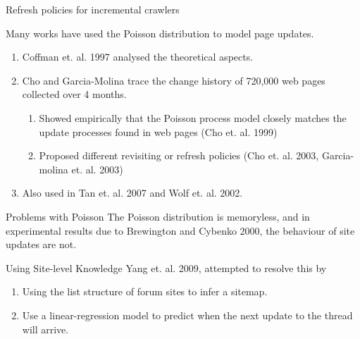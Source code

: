 \documentclass[compress]{beamer}
\begin{document}
\begin{frame}{Refresh policies for incremental crawlers}

Many works have used the Poisson distribution to model page updates.
	\begin{enumerate}
		\item Coffman et. al. 1997 analysed the theoretical aspects.
		\item Cho and Garcia-Molina trace the change history of 720,000 web pages collected over 4 months.
		\begin{enumerate}		
			\item Showed empirically that the Poisson process model closely matches the update processes found in web pages (Cho et. al. 1999)
			\item Proposed different revisiting or refresh policies (Cho et. al. 2003, Garcia-molina et. al. 2003)
		\end{enumerate}
		\item Also used in Tan et. al. 2007 and Wolf et. al. 2002. %
	\end{enumerate}
\end{frame}

\begin{frame}{Problems with Poisson}
	The Poisson distribution is memoryless, and in experimental results due to Brewington and Cybenko 2000, the behaviour of site updates are not. 
\end{frame}

\begin{frame}{Using Site-level Knowledge}
Yang et. al. 2009, attempted to resolve this by
	\begin{enumerate}
		\item Using the list structure of forum sites to infer a sitemap.
		\item Use a linear-regression model to predict when the next update to the thread will arrive. %
	\end{enumerate}
\end{frame}


\end{document}
